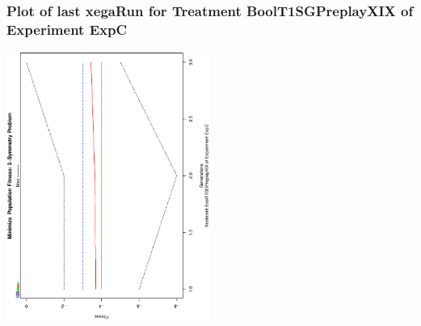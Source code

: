  \begin{frame}
 \frametitle{ Plot of last xegaRun for Treatment BoolT1SGPreplayXIX of Experiment ExpC }
 \begin{center}
\includegraphics[width=0.5\textwidth, angle=-90]
{ExpCPlotPopStatsFigure001.eps}
 \end{center}
 \label{report/ExpCPlotPopStatsFigure001.eps}  
 \end{frame}

